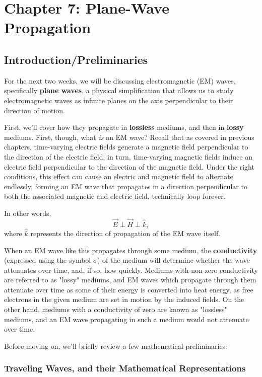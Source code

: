 \documentclass{article}
\begin{document}
\setcounter{section}{6}
\section{Chapter 7: Plane-Wave Propagation}
\setcounter{subsection}{-1}
\subsection{Introduction/Preliminaries}
For the next two weeks, we will be discussing electromagnetic (EM) waves, specifically \textbf{plane waves}, a physical simplification that allows us to study electromagnetic waves as infinite planes on the axis perpendicular to their direction of motion. 

First, we'll cover how they propagate in \textbf{lossless} mediums, and then in \textbf{lossy} mediums. First, though, what \textit{is} an EM wave? Recall that as covered in previous chapters, time-varying electric fields generate a magnetic field perpendicular to the direction of the electric field; in turn, time-varying magnetic fields induce an electric field perpendicular to the direction of the magnetic field. Under the right conditions, this effect can cause an electric and magnetic field to alternate endlessly, forming an EM wave that propagates in a direction perpendicular to both the associated magnetic and electric field. technically loop forever. 

In other words,
\[
  \vec{E} \perp \vec{H} \perp \hat{k},
\]
where \(\hat{k}\) represents the direction of propagation of the EM wave itself.

When an EM wave like this propagates through some medium, the \textbf{conductivity} (expressed using the symbol \(\sigma\)) of the medium will determine whether the wave attenuates over time, and, if so, how quickly. Mediums with non-zero conductivity are referred to as "lossy" mediums, and EM waves which propagate through them attenuate over time as some of their energy is converted into heat energy, as free electrons in the given medium are set in motion by the induced fields. On the other hand, mediums with a conductivity of zero are known as "lossless" mediums, and an EM wave propagating in such a medium would not attenuate over time.

Before moving on, we'll briefly review a few mathematical preliminaries:

\subsubsection{Traveling Waves, and their Mathematical Representations}
\end{document}

